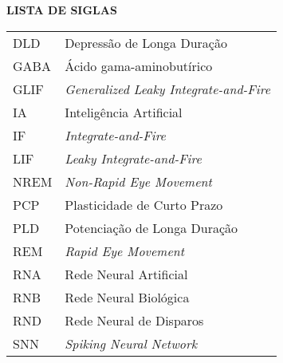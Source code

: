 \begin{center}
\textbf{LISTA DE SIGLAS}
\end{center}
\vspace*{0.5cm}
\begin{tabular}{ll}
DLD & Depressão de Longa Duração \\
GABA & Ácido gama-aminobutírico \\
GLIF & \textit{Generalized Leaky Integrate-and-Fire} \\
IA & Inteligência Artificial \\
IF & \textit{Integrate-and-Fire} \\
LIF & \textit{Leaky Integrate-and-Fire} \\
NREM & \textit{Non-Rapid Eye Movement} \\
PCP & Plasticidade de Curto Prazo \\
PLD & Potenciação de Longa Duração \\
REM & \textit{Rapid Eye Movement} \\
RNA & Rede Neural Artificial \\
RNB & Rede Neural Biológica \\
RND & Rede Neural de Disparos \\
SNN & \textit{Spiking Neural Network} \\
\end{tabular}
\addtocounter{table}{0}